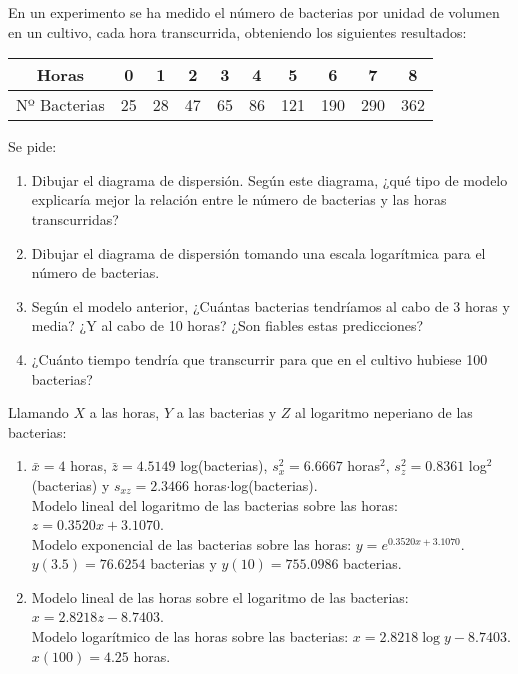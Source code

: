 {En un experimento se ha medido el número de bacterias por unidad de volumen en un cultivo, cada hora transcurrida,
obteniendo los siguientes resultados:
\begin{center}
\begin{tabular}{c|ccccccccc}
Horas & 0 & 1 & 2 & 3 & 4 & 5 & 6 & 7 & 8  \\
\hline
Nº Bacterias & 25 & 28 & 47 & 65 & 86 & 121 & 190 & 290 & 362
\end{tabular}
\end{center}

Se pide:
\begin{enumerate}
\item Dibujar el diagrama de dispersión.
Según este diagrama, ¿qué tipo de modelo explicaría mejor la relación entre le número de bacterias y las horas
transcurridas?
\item Dibujar el diagrama de dispersión tomando una escala logarítmica para el número de bacterias.
\item Según el modelo anterior, ¿Cuántas bacterias tendríamos al cabo de 3 horas y media?
¿Y al cabo de 10 horas?
¿Son fiables estas predicciones?
\item ¿Cuánto tiempo tendría que transcurrir para que en el cultivo hubiese 100 bacterias?
\end{enumerate}
}
{Llamando $X$ a las horas, $Y$ a las bacterias y $Z$ al logaritmo neperiano de las bacterias:
\begin{enumerate}[start=3]
\item $\bar x=4$ horas, $\bar z=4.5149$ log(bacterias), $s_x^2=6.6667$ horas$^2$, $s_z^2=0.8361$ log$^2$(bacterias) y
$s_{xz}=2.3466$ horas$\cdot$log(bacterias).\\
Modelo lineal del logaritmo de las bacterias sobre las horas: $z=0.3520x+3.1070$.\\
Modelo exponencial de las bacterias sobre las horas: $y=e^{0.3520x+3.1070}$.\\
$y(3.5)=76.6254$ bacterias y $y(10)=755.0986$ bacterias.
\item Modelo lineal de las horas sobre el logaritmo de las bacterias: $x=2.8218z-8.7403$.\\
Modelo logarítmico de las horas sobre las bacterias: $x=2.8218\log y-8.7403$.\\
$x(100)=4.25$ horas.
\end{enumerate}
}
{}


